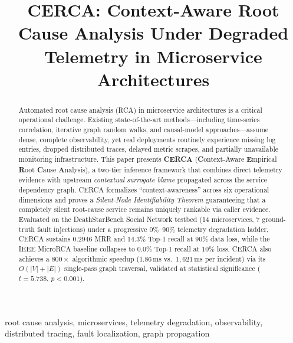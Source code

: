 \documentclass[conference]{IEEEtran}
\begin{document}
\title{CERCA: Context-Aware Root Cause Analysis Under Degraded Telemetry in Microservice Architectures}

\author{
}

\maketitle

\begin{abstract}
Automated root cause analysis (RCA) in microservice architectures is a critical operational challenge. Existing state-of-the-art methods---including time-series correlation, iterative graph random walks, and causal-model approaches---assume dense, complete observability, yet real deployments routinely experience missing log entries, dropped distributed traces, delayed metric scrapes, and partially unavailable monitoring infrastructure. This paper presents \textbf{CERCA} (\textbf{C}ontext-Aware \textbf{E}mpirical \textbf{R}oot \textbf{C}ause \textbf{A}nalysis), a two-tier inference framework that combines direct telemetry evidence with upstream \textit{contextual surrogate blame} propagated across the service dependency graph. CERCA formalizes ``context-awareness'' across six operational dimensions and proves a \textit{Silent-Node Identifiability Theorem} guaranteeing that a completely silent root-cause service remains uniquely rankable via caller evidence. Evaluated on the DeathStarBench Social Network testbed (14 microservices, 7 ground-truth fault injections) under a progressive $0\%$--$90\%$ telemetry degradation ladder, CERCA sustains $0.2946$ MRR and $14.3\%$ Top-1 recall at $90\%$ data loss, while the IEEE MicroRCA baseline collapses to $0.0\%$ Top-1 recall at $10\%$ loss. CERCA also achieves a $800\times$ algorithmic speedup ($1.86$\,ms vs.\ $1{,}621$\,ms per incident) via its $O(|V|+|E|)$ single-pass graph traversal, validated at statistical significance ($t=5.738$, $p < 0.001$).
\end{abstract}

\begin{IEEEkeywords}
root cause analysis, microservices, telemetry degradation, observability, distributed tracing, fault localization, graph propagation
\end{IEEEkeywords}
\end{document}
